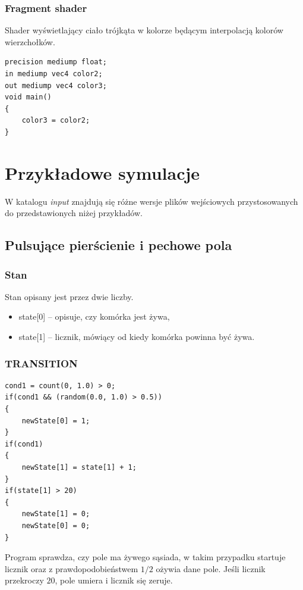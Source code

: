 \documentclass[declaration,shortabstract, inz]{iithesis}
\theoremstyle{definition} \newtheorem{definition}{Definicja}[]
\theoremstyle{plain} \newtheorem{remark}[definition]{Obserwacja}
\theoremstyle{plain} \newtheorem{theorem}[definition]{Twierdzenie}
\theoremstyle{plain} \newtheorem{example}{Przykład}[definition]
\theoremstyle{plain} \newtheorem{lemma}[definition]{Lemat}
\begin{document}
\subsection{Fragment shader}
Shader wyświetlający ciało trójkąta w kolorze będącym interpolacją kolorów wierzchołków.
\begin{center}
\begin{lstlisting}
precision mediump float;
in mediump vec4 color2;
out mediump vec4 color3;
void main()
{
	color3 = color2;
}
\end{lstlisting}
\end{center}

\chapter{Przykładowe symulacje}

W katalogu \textit{input} znajdują się różne wersje plików wejściowych przystosowanych do przedstawionych niżej przykładów.

\section{Pulsujące pierścienie i pechowe pola}

\subsection{Stan}
Stan opisany jest przez dwie liczby.
\begin{itemize}
\item state[0] -- opisuje, czy komórka jest żywa,
\item state[1] -- licznik, mówiący od kiedy komórka powinna być żywa.
\end{itemize}

\subsection{TRANSITION}

\begin{center}
\begin{lstlisting}
cond1 = count(0, 1.0) > 0;
if(cond1 && (random(0.0, 1.0) > 0.5))
{
    newState[0] = 1;
}
if(cond1)
{
    newState[1] = state[1] + 1;
}
if(state[1] > 20)
{
    newState[1] = 0;
    newState[0] = 0;
} 
\end{lstlisting}
\end{center}

Program sprawdza, czy pole ma żywego sąsiada, w takim przypadku startuje licznik oraz  z prawdopodobieństwem $1/2$ ożywia dane pole. Jeśli licznik przekroczy $20$, pole umiera i licznik się zeruje.
\end{document}

